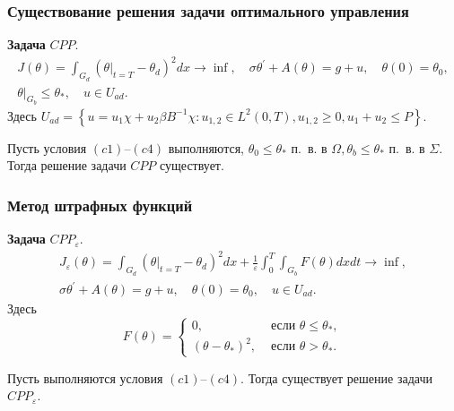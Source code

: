\begin{frame}
    \frametitle{Существование решения задачи оптимального управления}
    \textbf{Задача} $CPP$.
    \[
        \begin{gathered}
            J(\theta)=\int_{G_{d}}\left(\left.\theta\right|_{t=T}
            - \theta_{d}\right)^{2} d x \rightarrow \inf,
            \quad \sigma \theta^{\prime}+A(\theta)=g+u, \quad \theta(0)=\theta_{0}, \\
            \left.\theta\right|_{G_{b}} \leq \theta_{*}, \quad u \in U_{a d}.
        \end{gathered}
    \]
    Здесь
    $U_{a d}=\left\{u=u_{1} \chi+u_{2} \beta B^{-1} \chi: u_{1,2} \in L^{2}(0, T), u_{1,2}
    \geq 0, u_{1}+u_{2} \leq P\right\}$.

    \begin{theorem}[3.4]
        \label{th:3_3:1}
        Пусть условия $(c1)$--$(c4)$ выполняются,
        $\theta_{0} \leq \theta_{*}$ п.\ в. в $\Omega, \theta_{b} \leq \theta_{*}$ п.\ в. в $\Sigma$.
        Тогда решение задачи $CPP$ существует.
    \end{theorem}
\end{frame}

\begin{frame}
    \frametitle{Метод штрафных функций}

    \textbf{Задача} $CPP_{\varepsilon}$.
    \[
        \begin{gathered}
            J_{\varepsilon}(\theta)=\int_{G_{d}}
            \left(\left.\theta\right|_{t=T}
            -\theta_{d}\right)^{2} d x
            + \frac{1}{\varepsilon} \int_{0}^{T} \int_{G_{b}} F(\theta) d x d t \rightarrow \inf, \\
            \sigma \theta^{\prime}+A(\theta)=g+u, \quad \theta(0)=\theta_{0}, \quad u \in U_{a d}.
        \end{gathered}
    \]
    Здесь
    \[
        F(\theta)=
        \begin{cases}
            0, & \text { если } \theta \leq \theta_{*}, \\
            \left(\theta-\theta_{*}\right)^{2}, & \text { если } \theta>\theta_{*}.
        \end{cases}
    \]
    \begin{theorem}[3.5]
        \label{th:3_3:2}
        Пусть выполняются условия $(c1)$--$(c4)$.
        Тогда существует решение задачи $CPP_{\varepsilon}$.
    \end{theorem}
\end{frame}

